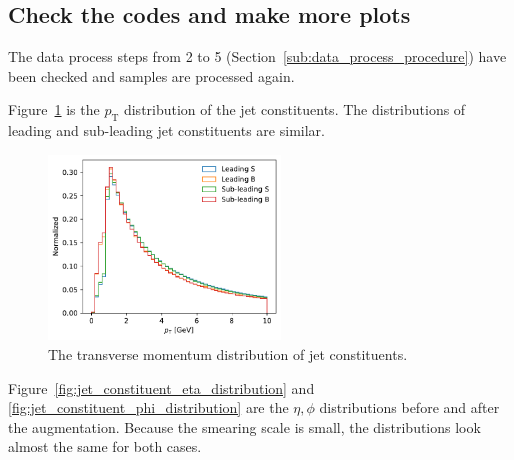 \documentclass[12pt]{article}
\begin{document}
    \subsection{Check the codes and make more plots}%
    \label{sub:check_the_codes_and_make_more_plots}
        The data process steps from 2 to 5 (Section~\ref{sub:data_process_procedure}) have been checked and samples are processed again.

        Figure~\ref{fig:jet_constituent_pt_distribution} is the $p_\text{T}$ distribution of the jet constituents. The distributions of leading and sub-leading jet constituents are similar.
        \begin{figure}[htpb]
            \centering
            \includegraphics[width=0.55\textwidth]{hv_model_pt_distribution.pdf}
            \caption{The transverse momentum distribution of jet constituents.}
            \label{fig:jet_constituent_pt_distribution}
        \end{figure}

        Figure~\ref{fig:jet_constituent_eta_distribution} and \ref{fig:jet_constituent_phi_distribution} are the $\eta, \phi$ distributions before and after the augmentation. Because the smearing scale is small, the distributions look almost the same for both cases.
\end{document}
